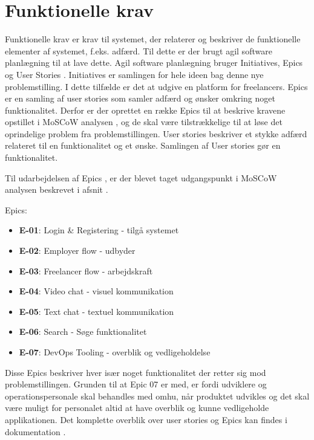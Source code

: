 \section{Funktionelle krav}

Funktionelle krav er krav til systemet, der relaterer og beskriver de funktionelle elementer af systemet, f.eks. adfærd. Til dette er der brugt agil software planlægning til at lave dette. Agil software planlægning bruger Initiatives, Epics og User Stories . Initiatives er samlingen for hele ideen bag denne nye problemstilling. I dette tilfælde er det at udgive en platform for freelancers. Epics er en samling af user stories som samler adfærd og ønsker omkring noget funktionalitet. Derfor er der oprettet en række Epics til at beskrive kravene opstillet i MoSCoW analysen \cite[MoSCoW]{converge-terms}, og de skal være tilstrækkelige til at løse det oprindelige problem fra problemstillingen. User stories beskriver et stykke adfærd relateret til en funktionalitet og et ønske. Samlingen af User stories gør en funktionalitet.

Til udarbejdelsen af Epics \cite[Epic]{converge-terms}, er der blevet taget udgangspunkt i MoSCoW analysen beskrevet i afsnit \cite[Overordnede krav]{doocumentation-kravspec}.

Epics:

\begin{itemize}
  \item \textbf{E-01}: Login \& Registering - tilgå systemet
  \item \textbf{E-02}: Employer flow - udbyder
  \item \textbf{E-03}: Freelancer flow - arbejdskraft
  \item \textbf{E-04}: Video chat - visuel kommunikation
  \item \textbf{E-05}: Text chat - textuel kommunikation
  \item \textbf{E-06}: Search - Søge funktionalitet
  \item \textbf{E-07}: DevOps Tooling - overblik og vedligeholdelse 
\end{itemize}

Disse Epics beskriver hver især noget funktionalitet der retter sig mod problemstillingen. Grunden til at Epic 07 er med, er fordi udviklere og operationspersonale skal behandles med omhu, når produktet udvikles og det skal være muligt for personalet altid at have overblik og kunne vedligeholde applikationen. Det komplette overblik over user stories og Epics kan findes i dokumentation \cite[Funktionelle krav]{doocumentation-kravspec}.
